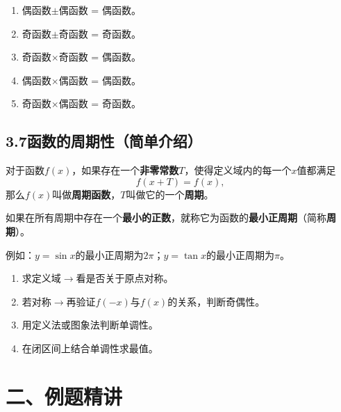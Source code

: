 \documentclass[12pt, a4paper]{ctexart}
\begin{document}
\begin{tipbox}[规律：奇偶性的常见结论]
\begin{enumerate}[leftmargin=2em]
  \item 偶函数$\pm$偶函数 = 偶函数。
  \item 奇函数$\pm$奇函数 = 奇函数。
  \item 奇函数$\times$奇函数 = 偶函数。
  \item 偶函数$\times$偶函数 = 偶函数。
  \item 奇函数$\times$偶函数 = 奇函数。
\end{enumerate}
\end{tipbox}

\subsection*{3.7\quad 函数的周期性（简单介绍）}

\begin{knowledgebox}[周期函数的定义]
对于函数$f(x)$，如果存在一个\textbf{非零常数}$T$，使得定义域内的每一个$x$值都满足
\[f(x+T) = f(x),\]
那么$f(x)$叫做\textbf{周期函数}，$T$叫做它的一个\textbf{周期}。

如果在所有周期中存在一个\textbf{最小的正数}，就称它为函数的\textbf{最小正周期}（简称\textbf{周期}）。

例如：$y=\sin x$的最小正周期为$2\pi$；$y=\tan x$的最小正周期为$\pi$。
\end{knowledgebox}

\begin{tipbox}[小结：函数性质的判断流程]
\begin{enumerate}[leftmargin=2em]
  \item 求定义域$\longrightarrow$看是否关于原点对称。
  \item 若对称$\longrightarrow$再验证$f(-x)$与$f(x)$的关系，判断奇偶性。
  \item 用定义法或图象法判断单调性。
  \item 在闭区间上结合单调性求最值。
\end{enumerate}
\end{tipbox}


\newpage
\section*{\textcolor{examorange}{二、例题精讲}}
\end{document}
